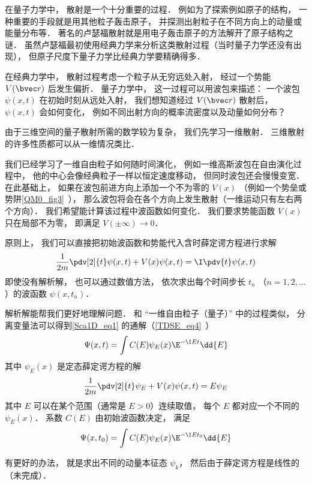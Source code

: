 
\begin{issues}
\issueDraft
\end{issues}


在量子力学中， 散射是一个十分重要的过程． 例如为了探索例如原子的结构， 一种重要的手段就是用其他粒子轰击原子， 并探测出射粒子在不同方向上的动量或能量分布等． 著名的卢瑟福散射就是用电子轰击原子的方法解开了原子结构之谜． 虽然卢瑟福最初使用经典力学来分析这类散射过程（当时量子力学还没有出现）， 但原子尺度下量子力学比经典力学要精确得多．

在经典力学中， 散射过程考虑一个粒子从无穷远处入射， 经过一个势能 $V(\bvec r)$ 后发生偏折． 量子力学中， 这一过程可以用波包来描述： 一个波包 $\psi(x, t)$ 在初始时刻从远处入射， 我们想知道经过 $V(\bvec r)$ 散射后， $\psi(x, t)$ 会如何变化， 例如不同出射方向的概率流密度以及动量如何分布？

由于三维空间的量子散射所需的数学较为复杂， 我们先学习一维散射． 三维散射的许多性质都可以从一维情况类比．

我们已经学习了一维自由粒子如何随时间演化， 例如一维高斯波包在自由演化过程中， 他的中心会像经典粒子一样以恒定速度移动， 但同时波包还会慢慢变宽． 在此基础上， 如果在波包前进方向上添加一个不为零的 $V(x)$ （例如一个势垒或势阱\autoref{QM0_fig3}~）， 那么波包将会在各个方向上发生散射（一维运动只有左右两个方向）． 我们希望能计算该过程中波函数如何变化． 我们要求势能函数 $V(x)$ 只在局部不为零， 即满足 $V(\pm\infty) \to 0$． 

原则上， 我们可以直接把初始波函数和势能代入含时薛定谔方程进行求解
\begin{equation}\label{Sca1D_eq1}
\frac{1}{2m}\pdv[2]{t}\psi(x, t) + V(x) \psi(x, t) = \I \pdv{t} \psi(x, t)
\end{equation}
即使没有解析解， 也可以通过数值方法， 依次求出每个时间步长 $t_n$ （$n = 1, 2, \dots$）的波函数 $\psi(x, t_n)$．

解析解能帮我们更好地理解问题． 和 “一维自由粒子（量子）” 中的过程类似， 分离变量法可以得到\autoref{Sca1D_eq1} 的通解（\autoref{TDSE_eq4}~）
\begin{equation}
\Psi(x, t) = \int C(E) \psi_E(x) \E^{-\I E t} \dd{E}
\end{equation}
其中 $\psi_E(x)$ 是定态薛定谔方程的解
\begin{equation}
\frac{1}{2m}\pdv[2]{t}\psi_E + V(x) \psi(x, t) = E \psi_E
\end{equation}
其中 $E$ 可以在某个范围（通常是 $E > 0$）连续取值， 每个 $E$ 都对应一个不同的 $\psi_E(x)$． 系数 $C(E)$ 由初始波函数决定， 满足
\begin{equation}
\Psi(x, t_0) = \int C(E) \psi_E(x) \E^{-\I E t_0} \dd{E}
\end{equation}


有更好的办法， 就是求出不同的动量本征态 $\psi_k$， 然后由于薛定谔方程是线性的（未完成）．


